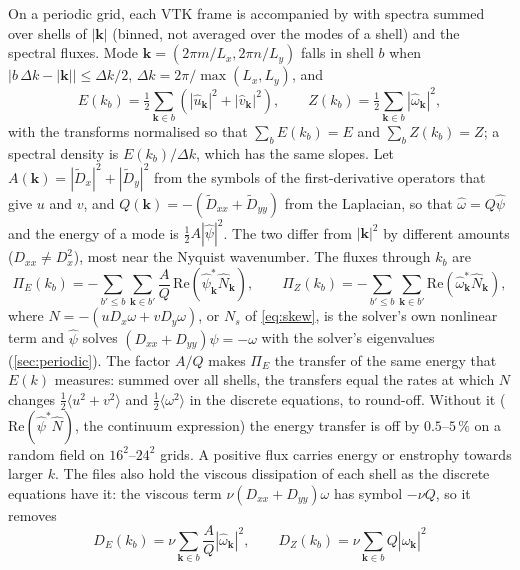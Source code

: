 \documentclass[11pt,a4paper]{article}
\newcommand{\code}[1]{\texttt{\detokenize{#1}}}
\begin{document}
On a periodic grid, each VTK frame is accompanied by \code{output/spectrum-1-<n>.csv} with spectra summed over shells of $|\mathbf{k}|$ (binned, not averaged over the modes of a shell) and the spectral fluxes.  Mode $\mathbf{k}=(2\pi m/L_x,2\pi n/L_y)$ falls in shell $b$ when $|b\,\Delta k-|\mathbf{k}||\le\Delta k/2$, $\Delta k=2\pi/\max(L_x,L_y)$, and
\begin{equation}
E(k_b)=\tfrac12\sum_{\mathbf{k}\in b}\left(|\hat u_\mathbf{k}|^2+|\hat v_\mathbf{k}|^2\right),\qquad
Z(k_b)=\tfrac12\sum_{\mathbf{k}\in b}|\hat\omega_\mathbf{k}|^2,
\end{equation}
with the transforms normalised so that $\sum_bE(k_b)=E$ and $\sum_bZ(k_b)=Z$; a spectral density is $E(k_b)/\Delta k$, which has the same slopes.  Let $A(\mathbf{k})=|\tilde D_x|^2+|\tilde D_y|^2$ from the symbols of the first-derivative operators that give $u$ and $v$, and $Q(\mathbf{k})=-(\tilde D_{xx}+\tilde D_{yy})$ from the Laplacian, so that $\hat\omega=Q\hat\psi$ and the energy of a mode is $\tfrac12A|\hat\psi|^2$.  The two differ from $|\mathbf{k}|^2$ by different amounts ($D_{xx}\ne D_x^2$), most near the Nyquist wavenumber.  The fluxes through $k_b$ are
\begin{equation}
\Pi_E(k_b)=-\sum_{b'\le b}\sum_{\mathbf{k}\in b'}\frac{A}{Q}\,\mathrm{Re}\left(\hat\psi^*_\mathbf{k}\hat N_\mathbf{k}\right),\qquad
\Pi_Z(k_b)=-\sum_{b'\le b}\sum_{\mathbf{k}\in b'}\mathrm{Re}\left(\hat\omega^*_\mathbf{k}\hat N_\mathbf{k}\right),
\end{equation}
where $N=-(uD_x\omega+vD_y\omega)$, or $N_s$ of \cref{eq:skew}, is the solver's own nonlinear term and $\hat\psi$ solves $(D_{xx}+D_{yy})\psi=-\omega$ with the solver's eigenvalues (\cref{sec:periodic}).  The factor $A/Q$ makes $\Pi_E$ the transfer of the same energy that $E(k)$ measures: summed over all shells, the transfers equal the rates at which $N$ changes $\tfrac12\langle u^2+v^2\rangle$ and $\tfrac12\langle\omega^2\rangle$ in the discrete equations, to round-off.  Without it ($\mathrm{Re}(\hat\psi^*\hat N)$, the continuum expression) the energy transfer is off by $0.5$--$5\,\%$ on a random field on $16^2$--$24^2$ grids.  A positive flux carries energy or enstrophy towards larger $k$.  The files also hold the viscous dissipation of each shell as the discrete equations have it: the viscous term $\nu(D_{xx}+D_{yy})\omega$ has symbol $-\nu Q$, so it removes
\begin{equation}
D_E(k_b)=\nu\sum_{\mathbf{k}\in b}\frac{A}{Q}|\hat\omega_\mathbf{k}|^2,\qquad
D_Z(k_b)=\nu\sum_{\mathbf{k}\in b}Q|\hat\omega_\mathbf{k}|^2
\end{equation}
\end{document}
